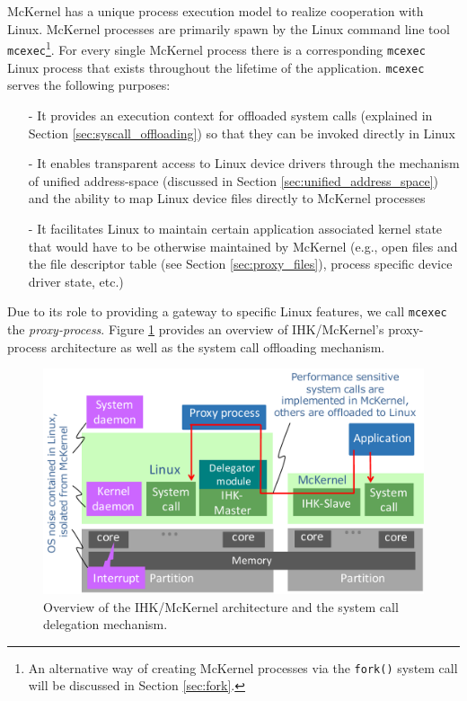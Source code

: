 \documentclass[twoside,11pt,fleqn]{book}
\begin{document}
\section{}

McKernel has a unique process execution model to realize cooperation with Linux.
McKernel processes are primarily spawn by the Linux command line
tool \texttt{mcexec}\footnote{An alternative way of creating McKernel processes
via the \texttt{fork()} system call will be discussed in Section \ref{sec:fork}.}.
For every single McKernel process there is a
corresponding \texttt{mcexec} Linux process that exists throughout
the lifetime of the application. \texttt{mcexec} serves the
following purposes:

\begin{itemize}
\item[-] It provides an execution context for offloaded system calls
(explained in Section \ref{sec:syscall_offloading})
so that they can be invoked directly in Linux
\item[-] It enables transparent access to Linux device drivers through the mechanism of unified address-space (discussed in Section \ref{sec:unified_address_space}) and the ability to map Linux device files directly to McKernel processes 
\item[-] It facilitates Linux to maintain certain application associated
kernel state that would have to be otherwise maintained by McKernel
(e.g., open files and the file descriptor table
(see Section \ref{sec:proxy_files}), process specific
device driver state, etc.)
\end{itemize}

Due to its role to providing a gateway to specific Linux features,
we call \texttt{mcexec} the \emph{proxy-process}.
Figure \ref{fig:syscall_offloading} provides an overview of IHK/McKernel's
proxy-process architecture as well as the system call offloading mechanism.
%
\begin{figure}[h!]
\centering
\includegraphics[width=0.82\linewidth]{figs/syscall_offloading.pdf}
\vspace{-0em}\caption{Overview of the IHK/McKernel architecture and
the system call delegation mechanism.}
\label{fig:syscall_offloading}
\vspace{-0em}
\end{figure}
\FloatBarrier
\end{document}
